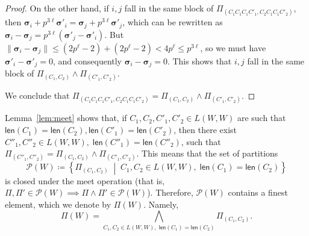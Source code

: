 \documentclass[letterpaper, 11pt, thm-restate]{article}
\numberwithin{equation}{section}
\newcommand{\mmP}{\mathscr{P}}
\newcommand{\bsig}{\boldsymbol{\sigma}}
\newcommand{\len}{\mathsf{len}}
\theoremstyle{definition}
\theoremstyle{definition}
\theoremstyle{definition}
\begin{document}
\begin{proof}
    On the other hand, if $i, j$ fall in the same block of $\Pi_{(C_1C_1C_1C'_1, C_2C_1C_1C'_2)}$, then $\bsig_i + p^{3\ell} \bsig'_i = \bsig_j + p^{3\ell} \bsig'_j$, which can be rewritten as $\bsig_i - \bsig_j = p^{3\ell} (\bsig'_j - \bsig'_i)$.
    But $\|\bsig_i - \bsig_j\| \leq (2 p^{\ell} - 2) + (2 p^{\ell} - 2) < 4 p^{\ell} \leq p^{3 \ell}$, so we must have $\bsig'_i - \bsig'_j = 0$, and consequently $\bsig_i - \bsig_j = 0$.
    This shows that $i, j$ fall in the same block of $\Pi_{(C_1, C_2)} \wedge \Pi_{(C'_1, C'_2)}$.

    We conclude that $\Pi_{(C_1C_1C_1C'_1, C_2C_1C_1C'_2)} = \Pi_{(C_1, C_2)} \wedge \Pi_{(C'_1, C'_2)}$.
\end{proof}

Lemma~\ref{lem:meet} shows that, if $C_1, C_2, C'_1, C'_2 \in L(W, W)$ are such that $\len(C_1) = \len(C_2), \len(C'_1) = \len(C'_2)$, then there exist $C''_1, C''_2 \in L(W, W),\; \len(C''_1) = \len(C''_2)$, such that $\Pi_{(C''_1, C''_2)} = \Pi_{(C_1, C_2)} \wedge \Pi_{(C'_1, C'_2)}$.
This means that the set of partitions
\[
\mmP(W) \coloneqq \left\{\Pi_{(C_1, C_2)} \;\middle|\; C_1, C_2 \in L(W, W),\; \len(C_1) = \len(C_2) \right\}
\]
is closed under the meet operation (that is, $\Pi, \Pi' \in \mmP(W) \implies \Pi \wedge \Pi' \in \mmP(W)$).
Therefore, $\mmP(W)$ contains a finest element, which we denote by $\Pi(W)$.
Namely,
\[
\Pi(W) = \bigwedge_{C_1, C_2 \in L(W, W),\; \len(C_1) = \len(C_2)} \Pi_{(C_1, C_2)}.
\]
\end{document}
